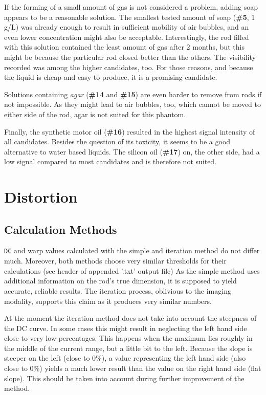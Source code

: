 If the forming of  a small amount of gas is not considered a problem, adding soap appears to be a reasonable solution.
The smallest tested amount of soap (\textbf{\#5}, 1 g/L) was already enough to result in sufficient mobility of air bubbles, and an even lower concentration might also be acceptable.
Interestingly, the rod filled with this solution contained the least amount of gas after 2 months, but this might be because the particular rod closed better than the others.
The visibility recorded was among the higher candidates, too.
For those reasons, and because the liquid is cheap and easy to produce, it is a promising candidate.

Solutions containing \textit{agar} (\textbf{\#14} and \textbf{\#15}) are even harder to remove from rods if not impossible.
As they might lead to air bubbles, too, which cannot be moved to either side of the rod, agar is not suited for this phantom.

Finally, the synthetic motor oil (\textbf{\#16}) resulted in the highest signal intensity of all candidates.
Besides the question of its toxicity, it seems to be a good alternative to water based liquids.
The silicon oil (\textbf{\#17}) on, the other side, had a low signal compared to most candidates and is therefore not suited.


\section{Distortion}

\subsection{Calculation Methods}
\texttt{DC} and warp values calculated with the simple and iteration method do not differ much.
Moreover, both methods choose very similar thresholds for their calculations (see header of appended '.txt' output file)
As the simple method uses additional information on the rod's true dimension, it is supposed to yield accurate, reliable results.
The iteration process, oblivious to the imaging modality, supports this claim as it produces very similar numbers.


At the moment the iteration method does not take into account the steepness of the DC curve.
In some cases this might result in neglecting the left hand side close to very low percentages.
This happens when the maximum lies roughly in the middle of the current range, but a little bit to the left.
Because the slope is steeper on the left (close to 0\%), a value representing the left hand side (also close to 0\%) yields a much lower result than the value on the right hand side (flat slope).
This should be taken into account during further improvement of the method. 


